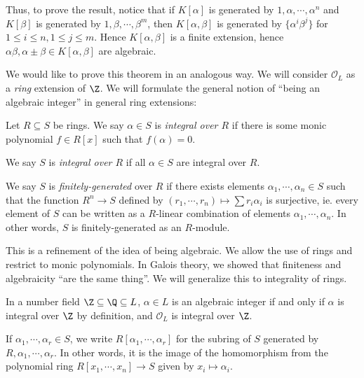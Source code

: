 \documentclass[a4paper]{article}
\begin{document}
Thus, to prove the result, notice that if $K[\alpha]$ is generated by $1, \alpha, \cdots, \alpha^n$ and $K[\beta]$ is generated by $1, \beta, \cdots, \beta^m$, then $K[\alpha, \beta]$ is generated by $\{\alpha^i \beta^j\}$ for $1 \leq i \leq n, 1 \leq j \leq m$. Hence $K[\alpha, \beta]$ is a finite extension, hence $\alpha\beta, \alpha \pm \beta \in K[\alpha, \beta]$ are algebraic.

We would like to prove this theorem in an analogous way. We will consider $\mathcal{O}_L$ as a \emph{ring} extension of $\Z$. We will formulate the general notion of ``being an algebraic integer'' in general ring extensions:

\begin{defi}[Integrality]
  Let $R \subseteq S$ be rings. We say $\alpha \in S$ is \emph{integral over $R$} if there is some monic polynomial $f \in R[x]$ such that $f(\alpha) = 0$.

  We say $S$ is \emph{integral over $R$} if all $\alpha \in S$ are integral over $R$.

  We say $S$ is \emph{finitely-generated} over $R$ if there exists elements $\alpha_1, \cdots, \alpha_n \in S$ such that the function $R^n \to S$ defined by $(r_1, \cdots, r_n) \mapsto \sum r_i \alpha_i$ is surjective, ie. every element of $S$ can be written as a $R$-linear combination of elements $\alpha_1, \cdots, \alpha_n$. In other words, $S$ is finitely-generated as an $R$-module.
\end{defi}
This is a refinement of the idea of being algebraic. We allow the use of rings and restrict to monic polynomials. In Galois theory, we showed that finiteness and algebraicity ``are the same thing''. We will generalize this to integrality of rings.

\begin{eg}
  In a number field $\Z \subseteq \Q \subseteq L$, $\alpha \in L$ is an algebraic integer if and only if $\alpha$ is integral over $\Z$ by definition, and $\mathcal{O}_L$ is integral over $\Z$.
\end{eg}

\begin{notation}
  If $\alpha_1, \cdots, \alpha_r \in S$, we write $R[\alpha_1, \cdots, \alpha_r]$ for the subring of $S$ generated by $R, \alpha_1, \cdots, \alpha_r$. In other words, it is the image of the homomorphism from the polynomial ring $R[x_1, \cdots, x_n] \to S$ given by $x_i \mapsto \alpha_i$.
\end{notation}
\end{document}
